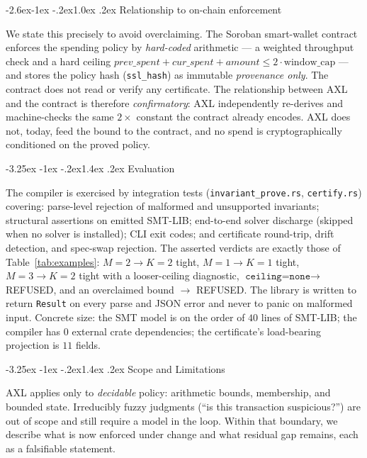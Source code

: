 \documentclass[11pt]{article}
\makeatletter
\renewcommand\section{\@startsection{section}{1}{\z@}%
  {-3.25ex \@plus -1ex \@minus -.2ex}{1.4ex \@plus.2ex}%
  {\normalfont\sffamily\Large\bfseries}}
\renewcommand\subsection{\@startsection{subsection}{2}{\z@}%
  {-2.6ex\@plus -1ex \@minus -.2ex}{1.0ex \@plus .2ex}%
  {\normalfont\sffamily\large\bfseries}}
\theoremstyle{plain}
\theoremstyle{definition}
\theoremstyle{remark}
\makeatother
\begin{document}
\subsection{Relationship to on-chain enforcement}

We state this precisely to avoid overclaiming. The Soroban smart-wallet
contract enforces the spending policy by \emph{hard-coded} arithmetic --- a
weighted throughput check and a hard ceiling
$\textit{prev\_spent} + \textit{cur\_spent} + \textit{amount} \le
2\cdot\text{window\_cap}$ --- and stores the policy hash (\texttt{ssl\_hash})
as immutable \emph{provenance only}. The contract does not read or verify any
certificate. The relationship between AXL and the contract is therefore
\emph{confirmatory}: AXL independently re-derives and machine-checks the same
$2\times$ constant the contract already encodes. AXL does not, today, feed the
bound to the contract, and no spend is cryptographically conditioned on the
proved policy.

\section{Evaluation}

The compiler is exercised by integration tests (\texttt{invariant\_prove.rs},
\texttt{certify.rs}) covering: parse-level rejection of malformed and
unsupported invariants; structural assertions on emitted SMT-LIB; end-to-end
solver discharge (skipped when no solver is installed); CLI exit codes; and
certificate round-trip, drift detection, and spec-swap rejection. The asserted
verdicts are exactly those of Table~\ref{tab:examples}: $M{=}2\to K{=}2$ tight,
$M{=}1\to K{=}1$ tight, $M{=}3\to K{=}2$ tight with a looser-ceiling
diagnostic, $\texttt{ceiling=none}\to$ REFUSED, and an overclaimed bound $\to$
REFUSED. The library is written to return \texttt{Result} on every parse and
JSON error and never to panic on malformed input. Concrete size: the SMT model
is on the order of $40$ lines of SMT-LIB; the compiler has $0$ external crate
dependencies; the certificate's load-bearing projection is $11$ fields.

\section{Scope and Limitations}\label{sec:scope}

AXL applies only to \emph{decidable} policy: arithmetic bounds, membership, and
bounded state. Irreducibly fuzzy judgments (``is this transaction
suspicious?'') are out of scope and still require a model in the loop. Within
that boundary, we describe what is now enforced under change and what residual
gap remains, each as a falsifiable statement.
\end{document}
